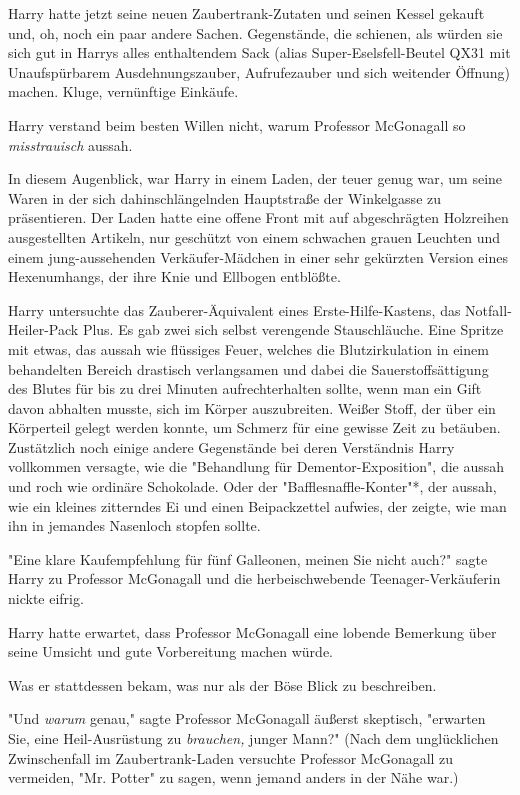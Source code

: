 {\later

Harry hatte jetzt seine neuen Zaubertrank-Zutaten und seinen Kessel gekauft und, oh, noch ein paar andere Sachen. Gegenstände, die schienen, als würden sie sich gut in Harrys alles enthaltendem Sack (alias Super-Eselsfell-Beutel QX31 mit Unaufspürbarem Ausdehnungszauber, Aufrufezauber und sich weitender Öffnung) machen. Kluge, vernünftige Einkäufe.

Harry verstand beim besten Willen nicht, warum Professor McGonagall so \emph{misstrauisch} aussah.

In diesem Augenblick, war Harry in einem Laden, der teuer genug war, um seine Waren in der sich dahinschlängelnden Hauptstraße der Winkelgasse zu präsentieren. Der Laden hatte eine offene Front mit auf abgeschrägten Holzreihen ausgestellten Artikeln, nur geschützt von einem schwachen grauen Leuchten und einem jung-aussehenden Verkäufer-Mädchen in einer sehr gekürzten Version eines Hexenumhangs, der ihre Knie und Ellbogen entblößte.

Harry untersuchte das Zauberer-Äquivalent eines Erste-Hilfe-Kastens, das Notfall-Heiler-Pack Plus. Es gab zwei sich selbst verengende Stauschläuche. Eine Spritze mit etwas, das aussah wie flüssiges Feuer, welches die Blutzirkulation in einem behandelten Bereich drastisch verlangsamen und dabei die Sauerstoffsättigung des Blutes für bis zu drei Minuten aufrechterhalten sollte, wenn man ein Gift davon abhalten musste, sich im Körper auszubreiten. Weißer Stoff, der über ein Körperteil gelegt werden konnte, um Schmerz für eine gewisse Zeit zu betäuben. Zustätzlich noch einige andere Gegenstände bei deren Verständnis Harry vollkommen versagte, wie die "Behandlung für Dementor-Exposition", die aussah und roch wie ordinäre Schokolade. Oder der "Bafflesnaffle-Konter"*, der aussah, wie ein kleines zitterndes Ei und einen Beipackzettel aufwies, der zeigte, wie man ihn in jemandes Nasenloch stopfen sollte.

"Eine klare Kaufempfehlung für fünf Galleonen, meinen Sie nicht auch?" sagte Harry zu Professor McGonagall und die herbeischwebende Teenager-Verkäuferin nickte eifrig.

Harry hatte erwartet, dass Professor McGonagall eine lobende Bemerkung über seine Umsicht und gute Vorbereitung machen würde.

Was er stattdessen bekam, was nur als der Böse Blick zu beschreiben.

"Und \emph{warum} genau," sagte Professor McGonagall äußerst skeptisch, "erwarten Sie, eine Heil-Ausrüstung zu \emph{brauchen,} junger Mann?" (Nach dem unglücklichen Zwinschenfall im Zaubertrank-Laden versuchte Professor McGonagall zu vermeiden, "Mr. Potter" zu sagen, wenn jemand anders in der Nähe war.)

}
